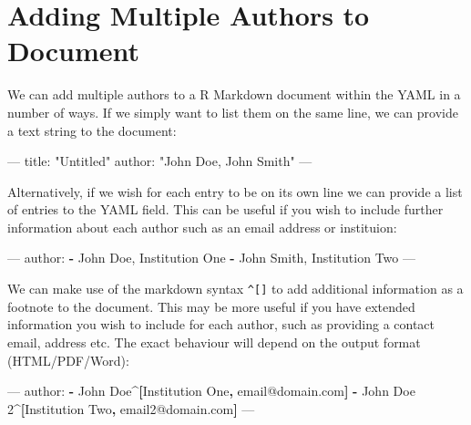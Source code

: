 \documentclass[]{book}
\newenvironment{Shaded}{\begin{snugshade}}{\end{snugshade}}
\newcommand{\KeywordTok}[1]{\textcolor[rgb]{0.13,0.29,0.53}{\textbf{#1}}}
\newcommand{\StringTok}[1]{\textcolor[rgb]{0.31,0.60,0.02}{#1}}
\newcommand{\OtherTok}[1]{\textcolor[rgb]{0.56,0.35,0.01}{#1}}
\newcommand{\FunctionTok}[1]{\textcolor[rgb]{0.00,0.00,0.00}{#1}}
\newcommand{\AttributeTok}[1]{\textcolor[rgb]{0.77,0.63,0.00}{#1}}
\newcommand{\NormalTok}[1]{#1}
\begin{document}
\section{Adding Multiple Authors to
Document}\label{adding-multiple-authors-to-document}

We can add multiple authors to a R Markdown document within the YAML in
a number of ways. If we simply want to list them on the same line, we
can provide a text string to the document:

\begin{Shaded}
\begin{Highlighting}[]
\OtherTok{---}
\FunctionTok{title:}\AttributeTok{ }\StringTok{"Untitled"}
\FunctionTok{author:}\AttributeTok{ }\StringTok{"John Doe, John Smith"}
\OtherTok{---}
\end{Highlighting}
\end{Shaded}

Alternatively, if we wish for each entry to be on its own line we can
provide a list of entries to the YAML field. This can be useful if you
wish to include further information about each author such as an email
address or instituion:

\begin{Shaded}
\begin{Highlighting}[]
\OtherTok{---}
\FunctionTok{author:}\AttributeTok{ }
\KeywordTok{-}\NormalTok{ John Doe, Institution One}
\KeywordTok{-}\NormalTok{ John Smith, Institution Two}
\OtherTok{---}
\end{Highlighting}
\end{Shaded}

We can make use of the markdown syntax \texttt{\^{}{[}{]}} to add
additional information as a footnote to the document. This may be more
useful if you have extended information you wish to include for each
author, such as providing a contact email, address etc. The exact
behaviour will depend on the output format (HTML/PDF/Word):

\begin{Shaded}
\begin{Highlighting}[]
\OtherTok{---}
\FunctionTok{author:}
\KeywordTok{-}\NormalTok{ John Doe^}\KeywordTok{[}\NormalTok{Institution One}\KeywordTok{,}\NormalTok{ email@domain.com}\KeywordTok{]}
\KeywordTok{-}\NormalTok{ John Doe 2^}\KeywordTok{[}\NormalTok{Institution Two}\KeywordTok{,}\NormalTok{ email2@domain.com}\KeywordTok{]}
\OtherTok{---}
\end{Highlighting}
\end{Shaded}
\end{document}
